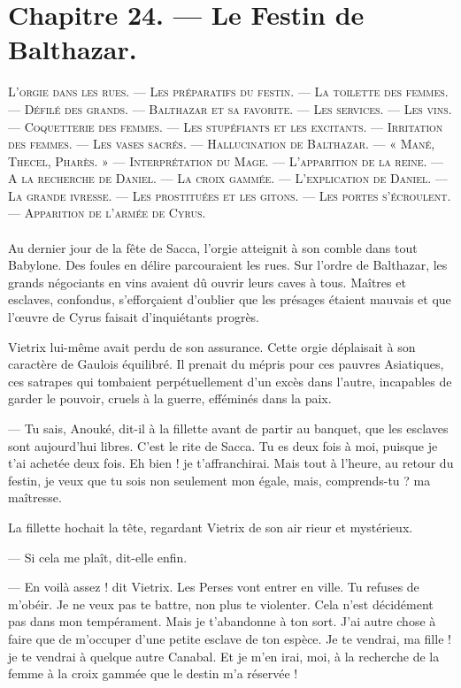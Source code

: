 \documentclass[a4paper, 11pt, oneside, polutonikogreek, french]{article}
\begin{document}
\section{Chapitre 24. --- Le Festin de Balthazar.}
\begin{center}
\scshape
\small
L'orgie dans les rues. --- Les préparatifs du festin. --- La toilette des femmes. --- Défilé des grands. --- Balthazar et sa favorite. --- Les services. --- Les vins. --- Coquetterie des femmes. --- Les stupéfiants et les excitants. --- Irritation des femmes. --- Les vases sacrés. --- Hallucination de Balthazar. --- « Mané, Thecel, Pharès. » --- Interprétation du Mage. --- L'apparition de la reine. --- A la recherche de Daniel. --- La croix gammée. --- L'explication de Daniel. --- La grande ivresse. --- Les prostituées et les gitons. --- Les portes s'écroulent. --- Apparition de l'armée de Cyrus.
\end{center}
\paragraph{}
Au dernier jour de la fête de Sacca, l'orgie atteignit à son comble dans tout Babylone. Des foules en délire parcouraient les rues. Sur l'ordre de Balthazar, les grands négociants en vins avaient dû ouvrir leurs caves à tous. Maîtres et esclaves, confondus, s'efforçaient d'oublier que les présages étaient mauvais et que l'œuvre de Cyrus faisait d'inquiétants progrès.

Vietrix lui-même avait perdu de son assurance. Cette orgie déplaisait à son caractère de Gaulois équilibré. Il prenait du mépris pour ces pauvres Asiatiques, ces satrapes qui tombaient perpétuellement d'un excès dans l'autre, incapables de garder le pouvoir, cruels à la guerre, efféminés dans la paix.

--- Tu sais, Anouké, dit-il à la fillette avant de partir au banquet, que les esclaves sont aujourd'hui libres. C'est le rite de Sacca. Tu es deux fois à moi, puisque je t'ai achetée deux fois. Eh bien ! je t'affranchirai. Mais tout à l'heure, au retour du festin, je veux que tu sois non seulement mon égale, mais, comprends-tu ? ma maîtresse.

La fillette hochait la tête, regardant Vietrix de son air rieur et mystérieux.

--- Si cela me plaît, dit-elle enfin.

--- En voilà assez ! dit Vietrix. Les Perses vont entrer en ville. Tu refuses de m'obéir. Je ne veux pas te battre, non plus te violenter. Cela n'est décidément pas dans mon tempérament. Mais je t'abandonne à ton sort. J'ai autre chose à faire que de m'occuper d'une petite esclave de ton espèce. Je te vendrai, ma fille ! je te vendrai à quelque autre Canabal. Et je m'en irai, moi, à la recherche de la femme à la croix gammée que le destin m'a réservée !
\end{document}
